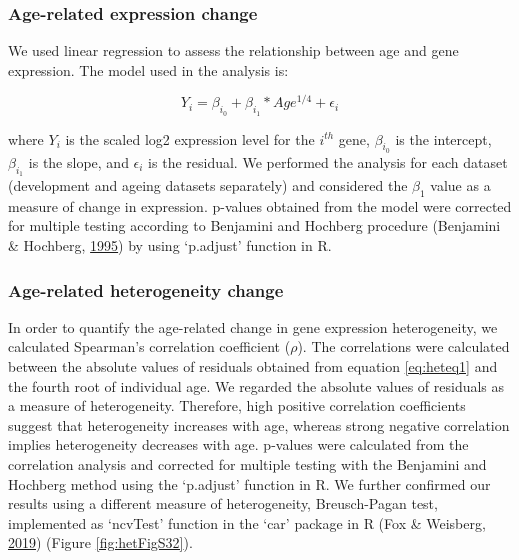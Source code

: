 \documentclass[12pt,twoside]{unicam}
\begin{document}
\hypertarget{age-related-expression-change}{%
\subsubsection{Age-related expression change}\label{age-related-expression-change}}

We used linear regression to assess the relationship between age and gene expression. The model used in the analysis is:

\begin{equation}
    Y_i = \beta_{i_0} + \beta_{i_1}*Age^{1/4} + \epsilon_i
  \label{eq:heteq1}
\end{equation}

where \(Y_i\) is the scaled log2 expression level for the \(i^{th}\) gene, \(\beta_{i_0}\) is the intercept, \(\beta_{i_1}\) is the slope, and \(\epsilon_i\) is the residual. We performed the analysis for each dataset (development and ageing datasets separately) and considered the \(\beta_1\) value as a measure of change in expression. p-values obtained from the model were corrected for multiple testing according to Benjamini and Hochberg procedure (Benjamini \& Hochberg, \protect\hyperlink{ref-Benjamini1995}{1995}) by using `p.adjust' function in R.

\hypertarget{age-related-heterogeneity-change}{%
\subsubsection{Age-related heterogeneity change}\label{age-related-heterogeneity-change}}

In order to quantify the age-related change in gene expression heterogeneity, we calculated Spearman's correlation coefficient (\(\rho\)). The correlations were calculated between the absolute values of residuals obtained from equation \eqref{eq:heteq1} and the fourth root of individual age. We regarded the absolute values of residuals as a measure of heterogeneity. Therefore, high positive correlation coefficients suggest that heterogeneity increases with age, whereas strong negative correlation implies heterogeneity decreases with age. p-values were calculated from the correlation analysis and corrected for multiple testing with the Benjamini and Hochberg method using the `p.adjust' function in R.
We further confirmed our results using a different measure of heterogeneity, Breusch-Pagan test, implemented as `ncvTest' function in the `car' package in R (Fox \& Weisberg, \protect\hyperlink{ref-Fox2019}{2019}) (Figure \ref{fig:hetFigS32}).
\end{document}
